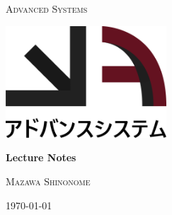 \documentclass[a4paper]{article}
\begin{document}
\begin{titlepage}
    \centering
    {\scshape\Huge Advanced Systems \par}
    \par\vspace{1cm}
    \includegraphics[width=0.45\textwidth]{images/logo.png}\par
    \vspace{3cm}
    {\huge\bfseries Lecture Notes \par}
    \vspace{1cm}
    {\scshape\large Mazawa Shinonome \par}
    \vspace{1cm}
    {\large\today\par}
    \vfill
    \begin{abstract}
        This document is a compilation of lecture notes for intermediate mathematics.
        It is intended to serve as a study guide for members of the Advanced System
        organization.
    \end{abstract}
\end{titlepage}

\newpage

\printnoidxglossary[type=\acronymtype]

\newpage

\tableofcontents

\newpage











\newpage

\medskip
\printbibliography
\end{document}

